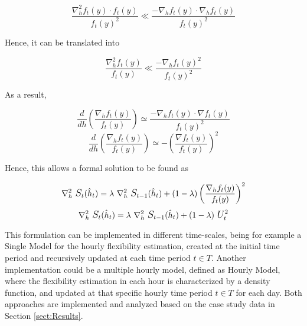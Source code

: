 \begin{equation}
    \frac{\nabla^2_h f_t (y) \cdot f_t (y)}{f_t (y)^2} \ll \frac{- \nabla_h f_t (y) \cdot \nabla_h f_t (y) }{f_t (y) ^2}
\end{equation}

Hence, it can be translated into 

\begin{equation}
    \frac{\nabla^2_h f_t (y)}{f_t (y)} \ll \frac{- \nabla_h f_t (y)^2 }{f_t (y) ^2}
\end{equation}

As a result,

\begin{equation}
\frac{d}{dh} \left(\frac{\nabla_h f_t (y)}{f_t (y)}\right) \simeq  \frac{- \nabla_h f_t (y) \cdot \nabla f_t (y) }{f_t (y) ^2}    
\end{equation}
\begin{equation}
\frac{d}{dh} \left(\frac{\nabla_h f_t (y)}{f_t (y)}\right) \simeq  - \left(\frac{\nabla f_t (y)}{f_t (y)} \right)^2  
\end{equation}

Hence, this allows a formal solution to be found as 

\begin{equation}
    \nabla^2_h \ \mathlarger{S}_t (\hat{h}_{t}) = \lambda \ \nabla^2_h \ \mathlarger{S}_{t-1} (\hat{h}_t) + (1-\lambda) \left(\frac{\nabla_h f_t (y)}{f_t (y)} \right)^2  
\end{equation}
\begin{equation}
     \nabla^2_h \ \mathlarger{S}_t (\hat{h}_{t}) = \lambda \ \nabla^2_h \ \mathlarger{S}_{t-1} (\hat{h}_t) + (1-\lambda) \ \mathlarger{U}_t^2
\end{equation}

This formulation can be implemented in different time-scales, being for example a Single Model for the hourly flexibility estimation, created at the initial time period and recursively updated at each time period $t \in T$. Another implementation could be a multiple hourly model, defined as Hourly Model, where the flexibility estimation in each hour is characterized by a density function, and updated at that specific hourly time period $t \in T$ for each day. Both approaches are implemented and analyzed based on the case study data in Section \ref{sect:Results}.

